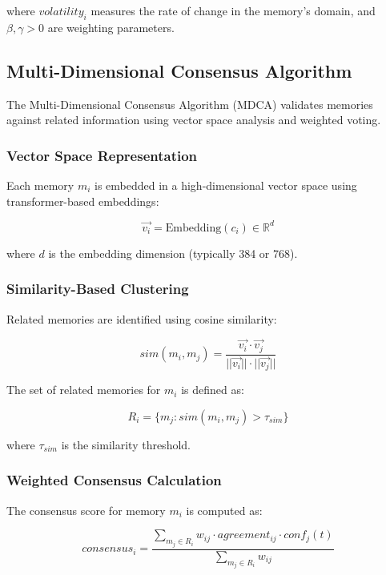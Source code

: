 \documentclass[12pt,a4paper]{article}
\newcommand{\R}{\mathbb{R}}
\begin{document}
where $volatility_i$ measures the rate of change in the memory's domain, and $\beta, \gamma > 0$ are weighting parameters.

\subsection{Multi-Dimensional Consensus Algorithm}

The Multi-Dimensional Consensus Algorithm (MDCA) validates memories against related information using vector space analysis and weighted voting.

\subsubsection{Vector Space Representation}

Each memory $m_i$ is embedded in a high-dimensional vector space using transformer-based embeddings:

\begin{equation}
\vec{v_i} = \text{Embedding}(c_i) \in \R^d
\end{equation}

where $d$ is the embedding dimension (typically 384 or 768).

\subsubsection{Similarity-Based Clustering}

Related memories are identified using cosine similarity:

\begin{equation}
sim(m_i, m_j) = \frac{\vec{v_i} \cdot \vec{v_j}}{||\vec{v_i}|| \cdot ||\vec{v_j}||}
\end{equation}

The set of related memories for $m_i$ is defined as:

\begin{equation}
R_i = \{m_j : sim(m_i, m_j) > \tau_{sim}\}
\end{equation}

where $\tau_{sim}$ is the similarity threshold.

\subsubsection{Weighted Consensus Calculation}

The consensus score for memory $m_i$ is computed as:

\begin{equation}
consensus_i = \frac{\sum_{m_j \in R_i} w_{ij} \cdot agreement_{ij} \cdot conf_j(t)}{\sum_{m_j \in R_i} w_{ij}}
\end{equation}
\end{document}
